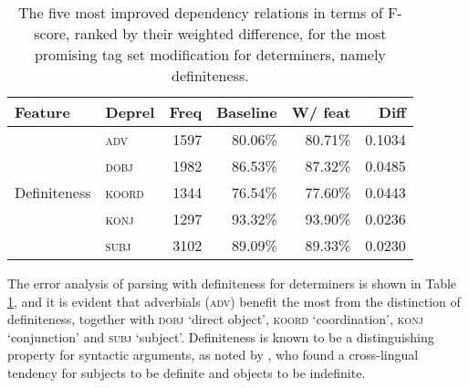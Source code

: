 \documentclass[a4paper,12pt,english]{book}
\begin{document}
\begin{table}
    \vspace{1ex}
    \centering
    \smaller[0.5]
    \begin{tabular}{@{}llrrrr@{}}
        \toprule
        \textbf{Feature} & \textbf{Deprel} & \textbf{Freq} &
        \textbf{Baseline} & \textbf{W/ feat} & \textbf{Diff} \\
        \midrule
        \multirow{5}{*}{Definiteness}
        & \textsc{adv} & 1597 & 80.06\% & 80.71\% & 0.1034 \\
        & \textsc{dobj} & 1982 & 86.53\% & 87.32\% & 0.0485 \\
        & \textsc{koord} & 1344 & 76.54\% & 77.60\% & 0.0443  \\
        & \textsc{konj} & 1297 & 93.32\% & 93.90\% & 0.0236 \\
        & \textsc{subj} & 3102 & 89.09\% & 89.33\% & 0.0230 \\
        \bottomrule
    \end{tabular}
    \caption{The five most improved dependency relations in terms of F-score,
        ranked by their weighted difference, for the most promising tag set
        modification for determiners, namely definiteness.}
    \label{detparseerror}
\end{table}

The error analysis of parsing with definiteness for determiners is shown in
Table \ref{detparseerror}, and it is evident that adverbials (\textsc{adv})
benefit the most from the distinction of definiteness, together with
\textsc{dobj} `direct object', \textsc{koord} `coordination', \textsc{konj}
`conjunction' and \textsc{subj} `subject'. Definiteness is known to be a
distinguishing property for syntactic arguments, as noted by ,
who found a cross-lingual tendency for subjects to be definite and objects to
be indefinite.
\end{document}
